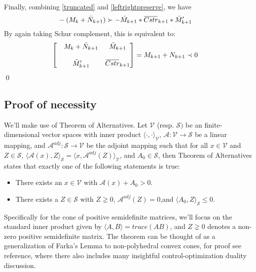 \documentclass{article}
\newcommand{\overbar}[1]{\mkern 1.5mu\overline{\mkern-1.5mu#1\mkern-1.5mu}\mkern 1.5mu}
\begin{document}
Finally, combining \eqref{truncated} and \eqref{leftrightpreserve}, we have
\begin{equation}\label{finalexpanded}
\begin{aligned}
&-(M_k+\bar{N}_{k+1})\succ - \tilde M_{k+1}*\overbar{Cstr}_{k+1}*\tilde M_{k+1}'
\end{aligned}
\end{equation}
By again taking Schur complement, this is equivalent to:
\begin{equation}\label{final}
\begin{aligned}
&\begin{bmatrix}
&M_k+\bar{N}_{k+1}  &\tilde M_{k+1} \\
\\
&\tilde M_{k+1}'&\overbar{Cstr}_{k+1}\\
\end{bmatrix}=M_{k+1}+N_{k+1}\prec 0
\end{aligned}
\end{equation}\qed


\subsection{Proof of necessity} %
\label{sub:subsection_name}

We'll make use of Theorem of Alternatives. Let $\mathcal{V}$ (resp. $\mathcal{S}) $ be an finite-dimensional vector spaces with inner product ${\langle \cdot,\cdot \rangle}_{\mathcal{V}}$, $\mathcal{A}: \mathcal{V} \rightarrow \mathcal{S}$ be a linear mapping, and $\mathcal{A}^{adj} :\mathcal{S} \rightarrow \mathcal{V}$ be the adjoint mapping such that for all $x \in \mathcal{V}$ and $Z \in \mathcal{S}$, ${\langle \mathcal{A}(x),Z\rangle}_{\mathcal{S}} = {\langle x, \mathcal{A}^{adj}(Z)\rangle}_{\mathcal{V}}$, and $A_0 \in \mathcal{S}$, then Theorem of Alternatives states that exactly one of the following statements is true:
\begin{itemize}
  \item There exists an $x \in \mathcal{V}$ with $\mathcal{A}(x)+A_0>0$.
  \item There exists a $Z \in \mathcal{S}$ with $Z \gneq 0$, $\mathcal{A}^{adj}(Z)=0$,and ${\langle A_0,Z\rangle}_{\mathcal{S}} \leq 0$.
\end{itemize}
Specifically for the cone of positive semidefinite matrices, we'll focus on the standard inner product given by ${\langle A,B\rangle}=trace(AB)$, and $Z \gneq 0$ denotes a non-zero positive semidefinite matrix. The theorem can be thought of as a generalization of Farka's Lemma to non-polyhedral convex cones, for proof see reference, where there also includes many insightful control-optimization duality discussion.
\end{document}
